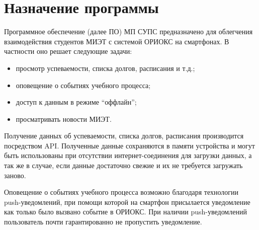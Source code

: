 \chapter{Назначение программы}
\label{ch:function}

Программное обеспечение (далее ПО) МП СУПС предназначено для облегчения взаимодействия студентов МИЭТ с системой ОРИОКС на смартфонах.
В частности оно решает следующие задачи:
\begin{itemize}
  \item просмотр успеваемости, списка долгов, расписания и т.д.;
  \item оповещение о событиях учебного процесса;
  \item доступ к данным в режиме ``оффлайн'';
  \item просматривать новости МИЭТ.
\end{itemize}

Получение данных об успеваемости, списка долгов, расписания производится посредством API\@.
Полученные данные сохраняются в памяти устройства и могут быть использованы при отсутствии интернет-соединения для загрузки данных, а так же в случае, если данные достаточно свежие и их не требуется загружать заново.

Оповещение о событиях учебного процесса возможно благодаря технологии push-уведомлений, при помощи которой на смартфон присылается уведомление как только было вызвано событие в ОРИОКС\@.
При наличии push-уведомлений пользователь почти гарантированно не пропустить уведомление.
